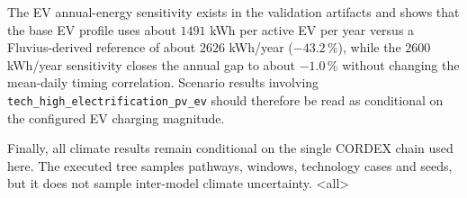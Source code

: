 The EV annual-energy sensitivity exists in the validation artifacts and shows that the base EV profile uses about $1491$ kWh per active EV per year versus a Fluvius-derived reference of about $2626$ kWh/year ($-43.2\,\%$), while the $2600$ kWh/year sensitivity closes the annual gap to about $-1.0\,\%$ without changing the mean-daily timing correlation. Scenario results involving \texttt{tech\_high\_electrification\_pv\_ev} should therefore be read as conditional on the configured EV charging magnitude.

Finally, all climate results remain conditional on the single CORDEX chain used here. The executed tree samples pathways, windows, technology cases and seeds, but it does not sample inter-model climate uncertainty.
\mode<all> %
